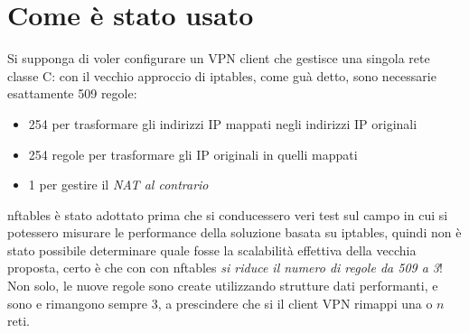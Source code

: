 \section{Come è stato usato}
Si supponga di voler configurare un VPN client che gestisce una singola rete classe C:
con il vecchio approccio di iptables, come guà detto, sono necessarie esattamente
509 regole:
\begin{itemize}
  \item 254 per trasformare gli indirizzi IP mappati negli indirizzi IP originali
  \item 254 regole per trasformare gli IP originali in quelli mappati
  \item 1 per gestire il \textit{NAT al contrario}
\end{itemize}
nftables è stato adottato prima che si conducessero veri test sul campo
in cui si potessero misurare le performance della soluzione basata su iptables,
quindi
non è stato possibile determinare quale fosse la scalabilità effettiva della vecchia
proposta, certo è che con con nftables \textit{si riduce il numero di regole
da 509 a 3}! Non solo, le nuove regole sono create utilizzando strutture
dati performanti, e sono e rimangono sempre 3, a prescindere che si il client VPN
rimappi una o $n$ reti.

